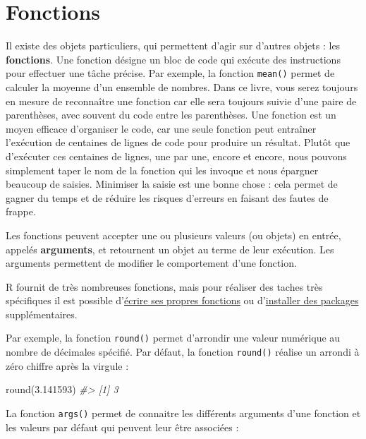 \documentclass[
  french,
]{scrbook}
\newenvironment{Shaded}{\begin{snugshade}}{\end{snugshade}}
\newcommand{\CommentTok}[1]{\textcolor[rgb]{0.56,0.35,0.01}{\textit{#1}}}
\newcommand{\FloatTok}[1]{\textcolor[rgb]{0.00,0.00,0.81}{#1}}
\newcommand{\FunctionTok}[1]{\textcolor[rgb]{0.00,0.00,0.00}{#1}}
\newcommand{\NormalTok}[1]{#1}
\begin{document}
\hypertarget{fonctions}{%
\section{Fonctions}\label{fonctions}}

Il existe des objets particuliers, qui permettent d'agir sur d'autres objets : les \textbf{fonctions}. Une fonction désigne un bloc de code qui exécute des instructions pour effectuer une tâche précise. Par exemple, la fonction \texttt{mean()} permet de calculer la moyenne d'un ensemble de nombres. Dans ce livre, vous serez toujours en mesure de reconnaître une fonction car elle sera toujours suivie d'une paire de parenthèses, avec souvent du code entre les parenthèses. Une fonction est un moyen efficace d'organiser le code, car une seule fonction peut entraîner l'exécution de centaines de lignes de code pour produire un résultat. Plutôt que d'exécuter ces centaines de lignes, une par une, encore et encore, nous pouvons simplement taper le nom de la fonction qui les invoque et nous épargner beaucoup de saisies. Minimiser la saisie est une bonne chose : cela permet de gagner du temps et de réduire les risques d'erreurs en faisant des fautes de frappe.

Les fonctions peuvent accepter une ou plusieurs valeurs (ou objets) en entrée, appelés \textbf{arguments}, et retournent un objet au terme de leur exécution. Les arguments permettent de modifier le comportement d'une fonction.

R fournit de très nombreuses fonctions, mais pour réaliser des taches très spécifiques il est possible d'\protect\hyperlink{fonctions-ecrire}{écrire ses propres fonctions} ou d'\protect\hyperlink{packages}{installer des packages} supplémentaires.

Par exemple, la fonction \texttt{round()} permet d'arrondir une valeur numérique au nombre de décimales spécifié. Par défaut, la fonction \texttt{round()} réalise un arrondi à zéro chiffre après la virgule :

\begin{Shaded}
\begin{Highlighting}[]
\FunctionTok{round}\NormalTok{(}\FloatTok{3.141593}\NormalTok{)}
\CommentTok{\#\textgreater{} [1] 3}
\end{Highlighting}
\end{Shaded}

La fonction \texttt{args()} permet de connaitre les différents arguments d'une fonction et les valeurs par défaut qui peuvent leur être associées :
\end{document}
